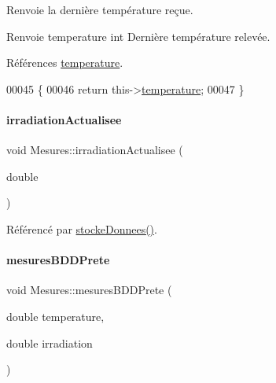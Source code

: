 Renvoie la dernière température reçue.

\begin{DoxyReturn}{Renvoie}
temperature int Dernière température relevée. 
\end{DoxyReturn}


Références \hyperlink{class_mesures_a2688d0da4acf9d91ea0befd6ed0bd140}{temperature}.


\begin{DoxyCode}
00045 \{
00046     \textcolor{keywordflow}{return} this->\hyperlink{class_mesures_a2688d0da4acf9d91ea0befd6ed0bd140}{temperature};
00047 \}
\end{DoxyCode}
\mbox{\label{class_mesures_a8a6e4db8850930d8e4e96c98d5aa95b8}} 
\paragraph{\texorpdfstring{irradiation\+Actualisee}{irradiationActualisee}}
{\footnotesize\ttfamily void Mesures\+::irradiation\+Actualisee (\begin{DoxyParamCaption}\item[{double}]{ }\end{DoxyParamCaption})\hspace{0.3cm}{\ttfamily [signal]}}



Référencé par \hyperlink{class_mesures_a77652c2332a9234bf08b463d1d389aa5}{stocke\+Donnees()}.

\mbox{\label{class_mesures_a97d8dbd7742519d1f3ce959661d8aede}} 
\paragraph{\texorpdfstring{mesures\+B\+D\+D\+Prete}{mesuresBDDPrete}}
{\footnotesize\ttfamily void Mesures\+::mesures\+B\+D\+D\+Prete (\begin{DoxyParamCaption}\item[{double}]{temperature,  }\item[{double}]{irradiation }\end{DoxyParamCaption})\hspace{0.3cm}{\ttfamily [signal]}}



